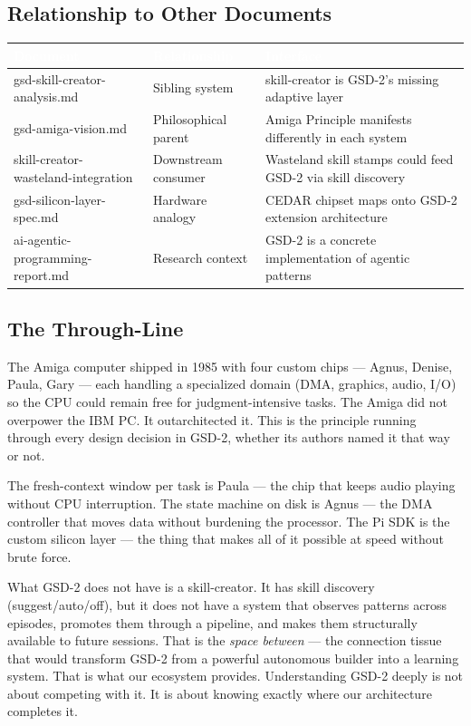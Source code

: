 \documentclass[11pt,letterpaper]{article}
\newcommand{\tableheader}[1]{\textbf{\sffamily\textcolor{white}{#1}}}
\begin{document}
\subsection{Relationship to Other Documents}

\begin{center}
\begin{tabularx}{\textwidth}{L{4cm}L{4cm}X}
\toprule
{}
\tableheader{Document} & \tableheader{Relationship} & \tableheader{Interface} \\
\midrule
gsd-skill-creator-analysis.md & Sibling system & skill-creator is GSD-2's missing adaptive layer \\
gsd-amiga-vision.md & Philosophical parent & Amiga Principle manifests differently in each system \\
skill-creator-wasteland-integration & Downstream consumer & Wasteland skill stamps could feed GSD-2 via skill discovery \\
gsd-silicon-layer-spec.md & Hardware analogy & CEDAR chipset maps onto GSD-2 extension architecture \\
ai-agentic-programming-report.md & Research context & GSD-2 is a concrete implementation of agentic patterns \\
\bottomrule
\end{tabularx}
\end{center}

\subsection{The Through-Line}

The Amiga computer shipped in 1985 with four custom chips --- Agnus, Denise, Paula, Gary --- each handling a specialized domain (DMA, graphics, audio, I/O) so the CPU could remain free for judgment-intensive tasks. The Amiga did not overpower the IBM PC. It outarchitected it. This is the principle running through every design decision in GSD-2, whether its authors named it that way or not.

The fresh-context window per task is Paula --- the chip that keeps audio playing without CPU interruption. The state machine on disk is Agnus --- the DMA controller that moves data without burdening the processor. The Pi SDK is the custom silicon layer --- the thing that makes all of it possible at speed without brute force.

What GSD-2 does not have is a skill-creator. It has skill discovery (suggest/auto/off), but it does not have a system that observes patterns across episodes, promotes them through a pipeline, and makes them structurally available to future sessions. That is the \emph{space between} --- the connection tissue that would transform GSD-2 from a powerful autonomous builder into a learning system. That is what our ecosystem provides. Understanding GSD-2 deeply is not about competing with it. It is about knowing exactly where our architecture completes it.
\end{document}
